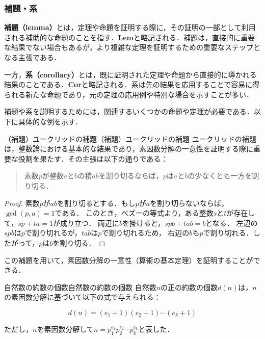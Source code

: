 \documentclass[a4paper,11pt]{ltjsarticle}
\renewcommand{\emph}[1]{\textbf{#1}}
\newenvironment{tleftbar}{\begin{tbleftline}\setlength{\parindent}{1\zw}}{\end{tbleftline}}
\begin{document}
\subsubsection{補題・系}

\emph{補題（lemma）}とは，定理や命題を証明する際に，その証明の一部として利用される補助的な命題のことを指す．\textbf{Lem}と略記される．補題は，直接的に重要な結果でない場合もあるが，より複雑な定理を証明するための重要なステップとなる主張である．

一方，\emph{系（corollary）}とは，既に証明された定理や命題から直接的に導かれる結果のことである．\textbf{Cor}と略記される．系は先の結果を応用することで容易に得られる新たな命題であり，元の定理の応用例や特別な場合を示すことが多い．

補題や系を説明するためには，関連するいくつかの命題や定理が必要である．以下に具体的な例を示す．

\begin{example}{（補題）ユークリッドの補題}{（補題）ユークリッドの補題}
ユークリッドの補題は，整数論における基本的な結果であり，素因数分解の一意性を証明する際に重要な役割を果たす．その主張は以下の通りである：

\begin{quote}
素数$p$が整数$a$と$b$の積$ab$を割り切るならば，$p$は$a$と$b$の少なくとも一方を割り切る．
\end{quote}

\end{example}

\begin{tleftbar}
\begin{proof}
素数$p$が$ab$を割り切るとする．もし$p$が$a$を割り切らないならば，$\gcd(p, a) = 1$である．
このとき，ベズーの等式より，ある整数$s$と$t$が存在して，$sp + ta = 1$が成り立つ．
両辺に$b$を掛けると，$spb + tab = b$となる．
左辺の$spb$は$p$で割り切れるが，$tab$は$p$で割り切れるため，
右辺の$b$も$p$で割り切れる．したがって，$p$は$b$を割り切る．
\end{proof}
\end{tleftbar}

この補題を用いて，素因数分解の一意性（算術の基本定理）を証明することができる．

\begin{example}{自然数の約数の個数}{自然数の約数の個数}
自然数$n$の正の約数の個数$d(n)$は，$n$の素因数分解に基づいて以下の式で与えられる：

\begin{equation}
d(n) = (e_1 + 1)(e_2 + 1) \dotsm (e_k + 1)
\end{equation}

ただし，$n$を素因数分解して$n = p_1^{e_1} p_2^{e_2} \dotsm p_k^{e_k}$と表した．
\end{example}
\end{document}
